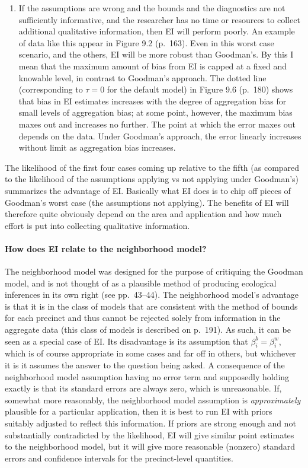 \documentclass[11pt,titlepage]{article}
\begin{document}
\begin{enumerate}
\item If the assumptions are wrong and the bounds and the diagnostics
  are not sufficiently informative, and the researcher has no time or
  resources to collect additional qualitative information, then EI
  will perform poorly.  An example of data like this appear in Figure
  9.2 (p.\ 163).  Even in this worst case scenario, and the others, EI
  will be more robust than Goodman's.  By this I mean that the maximum
  amount of bias from EI is capped at a fixed and knowable level, in
  contrast to Goodman's approach.  The dotted line (corresponding to
  $\tau=0$ for the default model) in Figure 9.6 (p.\ 180) shows that
  bias in EI estimates increases with the degree of aggregation bias
  for small levels of aggregation bias; at some point, however, the
  maximum bias maxes out and increases no further.  The point at which
  the error maxes out depends on the data.  Under Goodman's approach,
  the error linearly increases without limit as aggregation bias
  increases.
\end{enumerate}
The likelihood of the first four cases coming up relative to the fifth
(as compared to the likelihood of the assumptions applying vs not
applying under Goodman's) summarizes the advantage of EI.  Basically
what EI does is to chip off pieces of Goodman's worst case (the
assumptions not applying).  The benefits of EI will therefore quite
obviously depend on the area and application and how much effort is
put into collecting qualitative information.

\paragraph{How does EI relate to the neighborhood model?}
The neighborhood model was designed for the purpose of critiquing the
Goodman model, and is not thought of as a plausible method of
producing ecological inferences in its own right (see pp.\ 43--44).
The neighborhood model's advantage is that it is in the class of
models that are consistent with the method of bounds for each precinct
and thus cannot be rejected solely from information in the aggregate
data (this class of models is described on p.\ 191).  As such, it can
be seen as a special case of EI.  Its disadvantage is its assumption
that $\beta_i^b=\beta_i^w$, which is of course appropriate in some
cases and far off in others, but whichever it is it assumes the answer
to the question being asked.  A consequence of the neighborhood model
assumption having no error term and supposedly holding exactly is that
its standard errors are always zero, which is unreasonable.  If,
somewhat more reasonably, the neighborhood model assumption is
\emph{approximately} plausible for a particular application, then it
is best to run EI with priors suitably adjusted to reflect this
information.  If priors are strong enough and not substantially
contradicted by the likelihood, EI will give similar point estimates
to the neighborhood model, but it will give more reasonable (nonzero)
standard errors and confidence intervals for the precinct-level
quantities.
\end{document}
